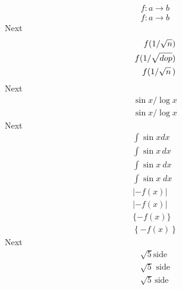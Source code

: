 \documentclass{amsart}
\begin{document}
\begin{align*}
    f \colon a \to b\\
    f: a \to b
\end{align*}
Next
\begin{align*}
    f(1/\sqrt n)\\
    f(1/\sqrt{\mathstrut dop})\\
    f(1/\sqrt n\,)
\end{align*}
Next
\begin{align*}
    \sin x / \log x\\
    \sin x / \!\log x
\end{align*}
Next
\begin{align*}
    \int \sin x dx\\
    \int \sin x\,dx\\
    \int \sin x\:dx\\
    \int \sin x\;dx\\
    |-f(x)|\\
    \left| -f(x) \right|\\
    \{-f(x)\}\\
    \left\{ -f(x) \right\}
\end{align*}
Next
\begin{align*}
    \sqrt5 \text{side}\\
    \sqrt5 \text{ side}\\
    \sqrt5 \,\text{side}
\end{align*}
\end{document}
